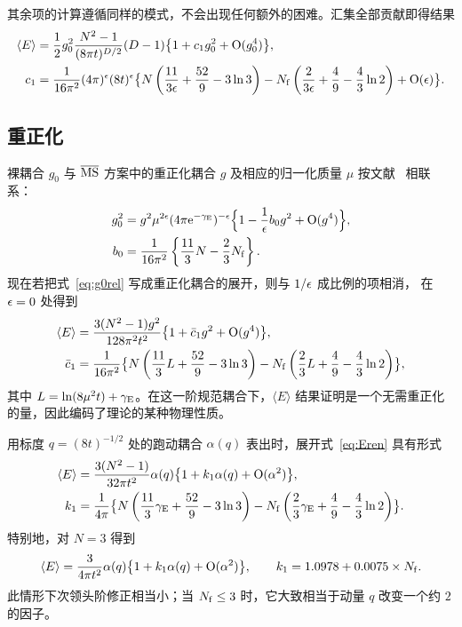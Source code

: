 其余项的计算遵循同样的模式，不会出现任何额外的困难。汇集全部贡献即得结果
\begin{align}
  \langle E\rangle&=\frac{1}{2}g_0^2{N^2-1\over(8\pi t)^{D/2}}(D-1)
  \bigl\{1+c_1g_0^2+\mathrm{O}(g_0^4)
  \bigr\},
  \label{eq:Epert}\\
  c_1&={1\over16\pi^2}(4\pi)^{\epsilon}(8t)^{\epsilon}\bigl\{
  N\left(\frac{11}{3\epsilon}+\frac{52}{9}-3\ln3\right)
  -N_{\mathrm{f}}\left(\frac{2}{3\epsilon}+\frac{4}{9}-\frac{4}{3}\ln2\right)
  +\mathrm{O}(\epsilon)\bigr\}.
\end{align}


\subsection{重正化}

裸耦合 $g_0$ 与 $\overline{\mathrm{MS}}$ 方案中的重正化耦合 $g$ 及相应的归一化质量 $\mu$
按文献~\cite{BardeenEtAl} 相联系：
\begin{align}
  g_0^2&=g^2\mu^{2\epsilon}(4\pi\mathrm{e}^{-\gamma_{\mathrm{E}}})^{-\epsilon}
  \Bigl\{1-\frac{1}{\epsilon}b_0g^2+\mathrm{O}(g^4)\Bigr\},
  \label{eq:g0rel}\\
  b_0&={1\over16\pi^2}\left\{\frac{11}{3}N-\frac{2}{3}N_{\mathrm{f}}\right\}.
\end{align}
现在若把式~\eqref{eq:g0rel} 写成重正化耦合的展开，则与 $1/\epsilon$ 成比例的项相消，
在 $\epsilon=0$ 处得到
\begin{align}
  \langle E\rangle&={3(N^2-1)g^2\over128\pi^2t^2}
  \bigl\{1+\bar{c}_1g^2+\mathrm{O}(g^4)
  \bigr\},
  \label{eq:Eren}\\
  \bar{c}_1&=
  {1\over16\pi^2}\bigl\{
  N\left(\frac{11}{3}L+\frac{52}{9}-3\ln3\right)
  -N_{\mathrm{f}}\left(\frac{2}{3}L+\frac{4}{9}-\frac{4}{3}\ln2\right)\bigr\},
\end{align}
其中 $L=\ln(8\mu^2t)+\gamma_{\mathrm{E}}$。在这一阶规范耦合下，$\langle E\rangle$
结果证明是一个无需重正化的量，因此编码了理论的某种物理性质。

用标度 $q=(8t)^{-1/2}$ 处的跑动耦合 $\alpha(q)$ 表出时，展开式~\eqref{eq:Eren}
具有形式
\begin{align}
  \langle E\rangle&={3(N^2-1)\over32\pi t^2}\alpha(q)
  \bigl\{1+k_1\alpha(q)+\mathrm{O}(\alpha^2)
  \bigr\},
  \label{eq:Erun}\\
  k_1&=
  {1\over4\pi}\bigl\{
  N\left(\frac{11}{3}\gamma_{\mathrm{E}}+\frac{52}{9}-3\ln3\right)
  -N_{\mathrm{f}}\left(\frac{2}{3}\gamma_{\mathrm{E}}+\frac{4}{9}-\frac{4}{3}\ln2\right)\bigr\}.
\end{align}
特别地，对 $N=3$ 得到
\begin{equation}
  \langle E\rangle={3\over4\pi t^2}\alpha(q)
  \bigl\{1+k_1\alpha(q)+\mathrm{O}(\alpha^2)
  \bigr\},
  \qquad
  k_1=1.0978+0.0075\times N_{\mathrm{f}}.
  \label{eq:E3}
\end{equation}
此情形下次领头阶修正相当小；当 $N_{\mathrm{f}}\leq3$ 时，它大致相当于动量 $q$
改变一个约 $2$ 的因子。



